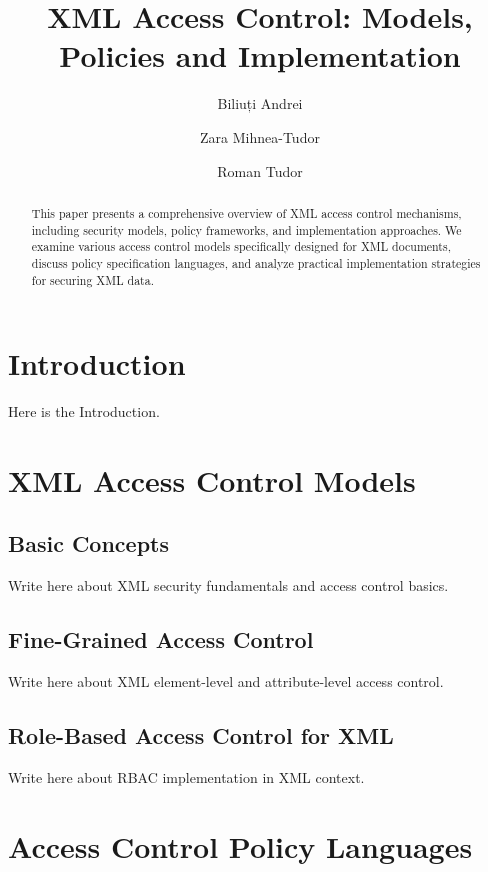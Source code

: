 \documentclass[runningheads]{llncs}
\begin{document}
\title{XML Access Control: Models, Policies and Implementation}
\author{Biliuți Andrei \and Zara Mihnea-Tudor \and Roman Tudor}
\maketitle
\begin{abstract}
This paper presents a comprehensive overview of XML access control mechanisms, including security models, policy frameworks, and implementation approaches. We examine various access control models specifically designed for XML documents, discuss policy specification languages, and analyze practical implementation strategies for securing XML data.
\end{abstract}

\section{Introduction}
Here is the Introduction.

\section{XML Access Control Models}

\subsection{Basic Concepts}
Write here about XML security fundamentals and access control basics.

\subsection{Fine-Grained Access Control}
Write here about XML element-level and attribute-level access control.

\subsection{Role-Based Access Control for XML}
Write here about RBAC implementation in XML context.

\section{Access Control Policy Languages}
\end{document}
